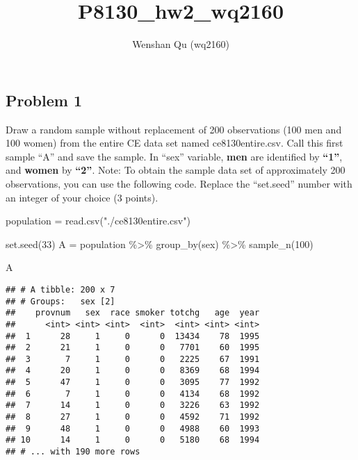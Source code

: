 \documentclass[
]{article}
\title{P8130\_hw2\_wq2160}
\author{Wenshan Qu (wq2160)}
\date{}
\newenvironment{Shaded}{\begin{snugshade}}{\end{snugshade}}
\newcommand{\DecValTok}[1]{\textcolor[rgb]{0.00,0.00,0.81}{#1}}
\newcommand{\FunctionTok}[1]{\textcolor[rgb]{0.00,0.00,0.00}{#1}}
\newcommand{\NormalTok}[1]{#1}
\newcommand{\OtherTok}[1]{\textcolor[rgb]{0.56,0.35,0.01}{#1}}
\newcommand{\SpecialCharTok}[1]{\textcolor[rgb]{0.00,0.00,0.00}{#1}}
\newcommand{\StringTok}[1]{\textcolor[rgb]{0.31,0.60,0.02}{#1}}
\begin{document}
\maketitle

\hypertarget{problem-1}{%
\subsection{Problem 1}\label{problem-1}}

Draw a random sample without replacement of 200 observations (100 men
and 100 women) from the entire CE data set named ce8130entire.csv. Call
this first sample ``A'' and save the sample. In ``sex'' variable,
\textbf{men} are identified by \textbf{``1''}, and \textbf{women} by
\textbf{``2''}. Note: To obtain the sample data set of approximately 200
observations, you can use the following code. Replace the ``set.seed''
number with an integer of your choice (3 points).

\begin{Shaded}
\begin{Highlighting}[]
\NormalTok{population }\OtherTok{=} \FunctionTok{read.csv}\NormalTok{(}\StringTok{"./ce8130entire.csv"}\NormalTok{)}

\FunctionTok{set.seed}\NormalTok{(}\DecValTok{33}\NormalTok{)}
\NormalTok{A }\OtherTok{=} 
\NormalTok{  population }\SpecialCharTok{\%\textgreater{}\%} 
  \FunctionTok{group\_by}\NormalTok{(sex) }\SpecialCharTok{\%\textgreater{}\%} 
  \FunctionTok{sample\_n}\NormalTok{(}\DecValTok{100}\NormalTok{)}

\NormalTok{A}
\end{Highlighting}
\end{Shaded}

\begin{verbatim}
## # A tibble: 200 x 7
## # Groups:   sex [2]
##    provnum   sex  race smoker totchg   age  year
##      <int> <int> <int>  <int>  <int> <int> <int>
##  1      28     1     0      0  13434    78  1995
##  2      21     1     0      0   7701    60  1995
##  3       7     1     0      0   2225    67  1991
##  4      20     1     0      0   8369    68  1994
##  5      47     1     0      0   3095    77  1992
##  6       7     1     0      0   4134    68  1992
##  7      14     1     0      0   3226    63  1992
##  8      27     1     0      0   4592    71  1992
##  9      48     1     0      0   4988    60  1993
## 10      14     1     0      0   5180    68  1994
## # ... with 190 more rows
\end{verbatim}
\end{document}
